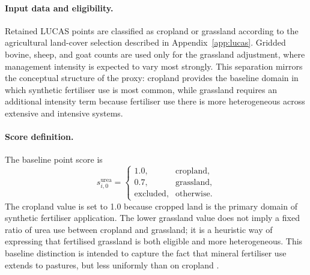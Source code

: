 \paragraph{Input data and eligibility.}
Retained LUCAS points are classified as cropland or grassland
according to the agricultural land-cover selection described in
Appendix~\ref{app:lucas}. Gridded bovine, sheep, and goat counts are
used only for the grassland adjustment, where management intensity is
expected to vary most strongly. This separation mirrors the conceptual
structure of the proxy: cropland provides the baseline domain in which
synthetic fertiliser use is most common, while grassland requires an
additional intensity term because fertiliser use there is more
heterogeneous across extensive and intensive systems.

\paragraph{Score definition.}
The baseline point score is
\begin{equation}
  s_{i,0}^{\mathrm{urea}} =
  \begin{cases}
    1.0, & \text{cropland},\\[3pt]
    0.7, & \text{grassland},\\[3pt]
    \text{excluded}, & \text{otherwise}.
  \end{cases}
\end{equation}
The cropland value is set to 1.0 because cropped land is the primary
domain of synthetic fertiliser application. The lower grassland value
does not imply a fixed ratio of urea use between cropland and
grassland; it is a heuristic way of expressing that fertilised
grassland is both eligible and more heterogeneous. This baseline
distinction is intended to capture the fact that mineral fertiliser use
extends to pastures, but less uniformly than on cropland
\citep{IFASTAT_consumption,einarsson_2021}.

